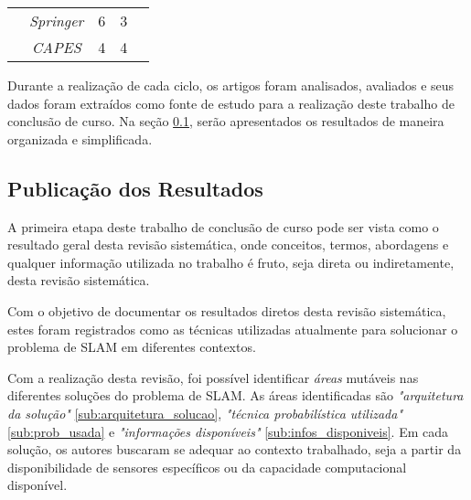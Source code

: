 \begin{table}[H]
\begin{tabular}{@{}c|c|c|c|c@{}}
                                 & \textit{Springer}                                                                   & 6                & 3                     &                                                                                                                                                                                              \\ \cline{2-4}
                                 & \textit{CAPES}                                                                      & 4                & 4                     &                                                                                                                                                                                              \\ \hline
\end{tabular}
\end{table}

Durante a realização de cada ciclo, os artigos foram analisados, avaliados e seus dados foram extraídos como fonte de estudo para a realização deste trabalho de conclusão de curso. Na seção \ref{sub:publicacaoRevisao}, serão apresentados os resultados de maneira organizada e simplificada.


	\subsection{Publicação dos Resultados} %
	\label{sub:publicacaoRevisao}

		A primeira etapa deste trabalho de conclusão de curso pode ser vista como o resultado geral desta revisão sistemática, onde conceitos, termos, abordagens e qualquer informação utilizada no trabalho é fruto, seja direta ou indiretamente, desta revisão sistemática.

		Com o objetivo de documentar os resultados diretos desta revisão sistemática, estes foram registrados como as técnicas utilizadas atualmente para solucionar o problema de SLAM em diferentes contextos.

		Com a realização desta revisão, foi possível identificar \textit{áreas} mutáveis nas diferentes soluções do problema de SLAM. As áreas identificadas são \textit{"arquitetura da solução"} \ref{sub:arquitetura_solucao}, \textit{"técnica probabilística utilizada"} \ref{sub:prob_usada} e \textit{"informações disponíveis"} \ref{sub:infos_disponiveis}. Em cada solução, os autores buscaram se adequar ao contexto trabalhado, seja a partir da disponibilidade de sensores específicos ou da capacidade computacional disponível.


